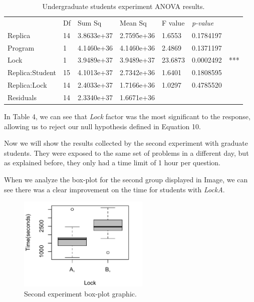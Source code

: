 \begin{table}
\begin{center}
\caption{Undergraduate students experiment ANOVA results.}
\begin{tabular}{|l|l|l|l|l|ll|}
\hline
                & Df &    Sum Sq  &  Mean Sq   & F value & \emph{p-value} &     \\  
Replica         & 14 & 3.8633e+37 & 2.7595e+36 & 1.6553  & 0.1784197 &     \\   
Program         & 1  & 4.1460e+36 & 4.1460e+36 & 2.4869  & 0.1371197 &     \\   
Lock            & 1  & 3.9489e+37 & 3.9489e+37 & 23.6873 & 0.0002492 & *** \\
Replica:Student & 15 & 4.1013e+37 & 2.7342e+36 & 1.6401  & 0.1808595 &     \\  
Replica:Lock    & 14 & 2.4033e+37 & 1.7166e+36 & 1.0297  & 0.4785520 &     \\  
Residuals       & 14 & 2.3340e+37 & 1.6671e+36 &         &           &     \\
\hline
\end{tabular}
\end{center}
\end{table}

In Table 4, we can see that \emph{Lock} factor was the most significant to the response, allowing us to reject our null hypothesis defined in Equation 10.

Now we will show the results collected by the second experiment with graduate students. They were exposed to the same set of problems in a different day, but as explained before, they only had a time limit of 1 hour per question.

When we analyze the box-plot for the second group displayed in Image, we can see there was a clear improvement on the time for students with \emph{LockA}.

\begin{figure}
\centering
\includegraphics[height=4.5cm]{img/g1.png}
\caption{Second experiment box-plot graphic.}
\end{figure}

